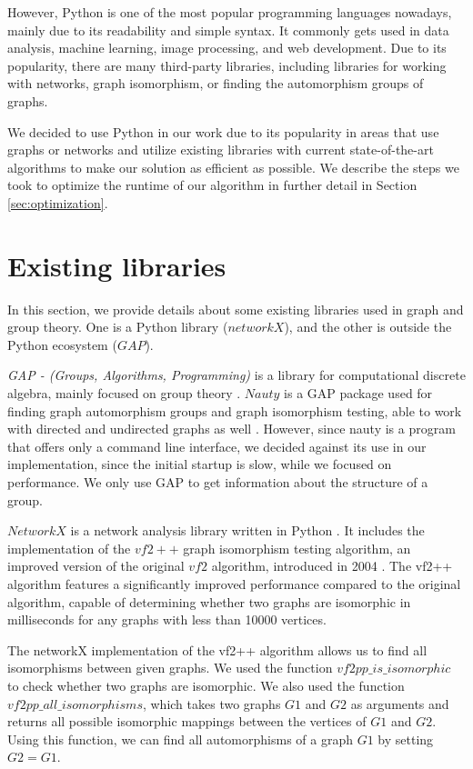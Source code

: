 However, Python is one of the most popular programming languages nowadays, mainly due to its readability and simple syntax. It commonly gets used in data analysis, machine learning, image processing, and web development. Due to its popularity, there are many third-party libraries, including libraries for working with networks, graph isomorphism, or finding the automorphism groups of graphs.

We decided to use Python in our work due to its popularity in areas that use graphs or networks and utilize existing libraries with current state-of-the-art algorithms to make our solution as efficient as possible. We describe the steps we took to optimize the runtime of our algorithm in further detail in Section \ref{sec:optimization}.

\section{Existing libraries}
In this section, we provide details about some existing libraries used in graph and group theory. One is a Python library ($networkX$), and the other is outside the Python ecosystem ($GAP$).

\emph{GAP - (Groups, Algorithms, Programming)} is a library for computational discrete algebra, mainly focused on group theory \cite{gap}. $Nauty$ is a GAP package used for finding graph automorphism groups and graph isomorphism testing, able to work with directed and undirected graphs as well \cite{nauty}. However, since nauty is a program that offers only a command line interface, we decided against its use in our implementation, since the initial startup is slow, while we focused on performance. We only use GAP to get information about the structure of a group.

$NetworkX$ is a network analysis library written in Python \cite{networkx}. It includes the implementation of the $vf2++$ graph isomorphism testing algorithm, an improved version of the original $vf2$ algorithm, introduced in 2004 \cite{vf2}\cite{vf2++}. The vf2++ algorithm features a significantly improved performance compared to the original algorithm, capable of determining whether two graphs are isomorphic in milliseconds for any graphs with less than 10000 vertices.

The networkX implementation of the vf2++ algorithm allows us to find all isomorphisms between given graphs. We used the function $vf2pp\_is\_isomorphic$ to check whether two graphs are isomorphic. We also used the function $vf2pp\_all\_isomorphisms$, which takes two graphs $G1$ and $G2$ as arguments and returns all possible isomorphic mappings between the vertices of $G1$ and $G2$. Using this function, we can find all automorphisms of a graph $G1$ by setting $G2 = G1$.

